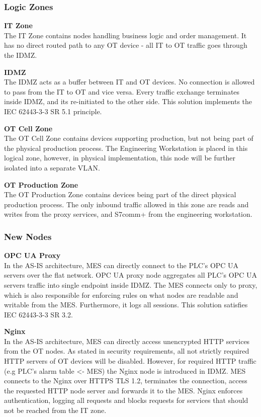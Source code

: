 \documentclass[11pt,a4paper]{article}
\begin{document}
% 
\subsubsection{Logic Zones}
\textbf{IT Zone} \\ The IT Zone contains nodes handling business logic and
order management. It has no direct routed path to any OT device - all IT to OT
traffic goes through the IDMZ.

\textbf{IDMZ} \\ The IDMZ acts as a buffer between IT and OT devices. No
connection is allowed to pass from the IT to OT and vice versa. Every traffic
exchange terminates inside IDMZ, and its re-initiated to the other side. This
solution implements the IEC 62443-3-3 SR 5.1 principle.

\textbf{OT Cell Zone} \\ The OT Cell Zone contains devices supporting
production, but not being part of the physical production process. The
Engineering Workstation is placed in this logical zone, however, in physical
implementation, this node will be further isolated into a separate VLAN.

\textbf{OT Production Zone} \\ The OT Production Zone contains devices being
part of the direct physical production process. The only inbound traffic allowed in
this zone are reads and writes from the proxy services, and S7comm+ from the
engineering workstation.

\subsubsection{New Nodes} 
\textbf{OPC UA Proxy} \\ In the AS-IS architecture,
MES can directly connect to the PLC's OPC UA servers over the flat network. OPC
UA proxy node aggregates all PLC's OPC UA servers traffic into single endpoint
inside IDMZ. The MES connects only to proxy, which is also responsible for
enforcing rules on what nodes are readable and writable from the MES.
Furthermore, it logs all sessions. This solution satisfies IEC 62443-3-3 SR
3.2.

\textbf{Nginx} \\ In the AS-IS architecture, MES can directly access unencrypted
HTTP services from the OT nodes. As stated in security requirements, all not
strictly required HTTP servers of OT devices will be disabled. However, for
required HTTP traffic (e.g PLC's alarm table <- MES) the Nginx node is
introduced in IDMZ. MES connects to the Nginx over HTTPS TLS 1.2, terminates
the connection, access the requested HTTP node server and forwards it to the
MES. Nginx enforces authentication, logging all requests and blocks requests for
services that should not be reached from the IT zone.
\end{document}
